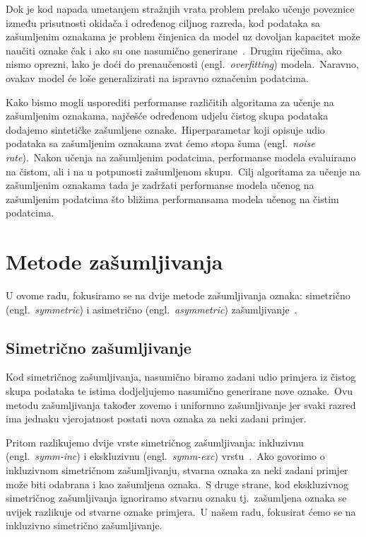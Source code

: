 \documentclass[diplomskirad]{fer}
\begin{document}
Dok je kod napada umetanjem stražnjih vrata problem prelako učenje poveznice između prisutnosti okidača i određenog ciljnog razreda, kod podataka sa zašumljenim oznakama je problem činjenica da model uz dovoljan kapacitet može naučiti oznake čak i ako su one nasumično generirane~\cite{zhang2016understanding}.\ 
Drugim riječima, ako nismo oprezni, lako je doći do prenaučenosti (engl.\ \textit{overfitting}) modela.\ Naravno, ovakav model će loše generalizirati na ispravno označenim podatcima.\ 
  
Kako bismo mogli usporediti performanse različitih algoritama za učenje na zašumljenim oznakama, najčešće određenom udjelu čistog skupa podataka dodajemo sintetičke zašumljene oznake.\ 
Hiperparametar koji opisuje udio podataka sa zašumljenim oznakama zvat ćemo stopa šuma (engl.\ \textit{noise rate}).\ Nakon učenja na zašumljenim podatcima, performanse modela evaluiramo na čistom, ali i na u potpunosti zašumljenom skupu.\ 
Cilj algoritama za učenje na zašumljenim oznakama tada je zadržati performanse modela učenog na zašumljenim podatcima što bližima performansama modela učenog na čistim podatcima.\ 

\section{Metode zašumljivanja}
\label{sek:metode_zasumljivanja}

U ovome radu, fokusiramo se na dvije metode zašumljivanja oznaka: simetrično (engl.\ \textit{symmetric}) i asimetrično (engl.\ \textit{asymmetric}) zašumljivanje~\cite{cordeiro2020survey}.\

\subsection{Simetrično zašumljivanje}
\label{sub:sim}

Kod simetričnog zašumljivanja, nasumično biramo zadani udio primjera iz čistog skupa podataka te istima dodjeljujemo nasumično generirane nove oznake.\ 
Ovu metodu zašumljivanja također zovemo i uniformno zašumljivanje jer svaki razred ima jednaku vjerojatnost postati nova oznaka za neki zadani primjer.\ 
  
Pritom razlikujemo dvije vrste simetričnog zašumljivanja: inkluzivnu (engl.\ \textit{symm-inc}) i ekskluzivnu (engl.\ \textit{symm-exc}) vrstu~\cite{cordeiro2020survey}.\ 
Ako govorimo o inkluzivnom simetričnom zašumljivanju, stvarna oznaka za neki zadani primjer može biti odabrana i kao zašumljena oznaka.\ 
S druge strane, kod ekskluzivnog simetričnog zašumljivanja ignoriramo stvarnu oznaku tj.\ zašumljena oznaka se uvijek razlikuje od stvarne oznake primjera.\ 
U našem radu, fokusirat ćemo se na inkluzivno simetrično zašumljivanje.\ 
\end{document}
